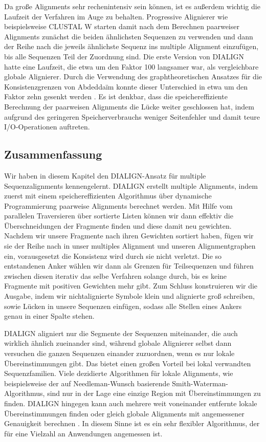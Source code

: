 Da große Alignments sehr rechenintensiv sein können, ist es außerdem wichtig die Laufzeit der Verfahren im Auge zu behalten. Progressive Alignierer wie beispielsweise CLUSTAL W starten damit nach dem Berechnen paarweiser Alignments zunächst die beiden ähnlichsten Sequenzen zu verwenden und dann der Reihe nach die jeweils ähnlichste Sequenz ins multiple Alignment einzufügen, bis alle Sequenzen Teil der Zuordnung sind.  Die erste Version von DIALIGN hatte eine Laufzeit, die etwa um den Faktor 100 langsamer war, als vergleichbare globale Alignierer. Durch die Verwendung des graphtheoretischen Ansatzes für die Konsistenzgrenzen von Abdedda\"im konnte dieser Unterschied in etwa um den Faktor zehn gesenkt werden \cite{am00}. Es ist denkbar, dass die speichereffiziente Berechnung der paarweisen Alignments die Lücke weiter geschlossen hat, indem aufgrund des geringeren Speicherverbrauchs weniger Seitenfehler und damit teure I/O-Operationen auftreten.


\subsection{Zusammenfassung}

Wir haben in diesem Kapitel den DIALIGN-Ansatz für multiple Sequenzalignments kennengelernt. DIALIGN erstellt multiple Alignments, indem zuerst mit einem speichereffizienten Algorithmus über dynamische Programmierung paarweise Alignments berechnet werden. Mit Hilfe vom parallelen Traversieren über sortierte Listen können wir dann effektiv die Überschneidungen der Fragmente finden und diese damit neu gewichten. Nachdem wir unsere Fragmente nach ihren Gewichten sortiert haben, fügen wir sie der Reihe nach in unser multiples Alignment und unseren Alignmentgraphen ein, vorausgesetzt die Konsistenz wird durch sie nicht verletzt. Die so entstandenen Anker wählen wir dann als Grenzen für Teilsequenzen und führen zwischen diesen iterativ das selbe Verfahren solange durch, bis es keine Fragmente mit positiven Gewichten mehr gibt. Zum Schluss konstruieren wir die Ausgabe, indem wir nichtalignierte Symbole klein und alignierte groß schreiben, sowie Lücken in unsere Sequenzen einfügen, sodass alle Stellen eines Ankers genau in einer Spalte stehen. 

DIALIGN aligniert nur die Segmente der Sequenzen miteinander, die auch wirklich ähnlich zueinander sind, während globale Alignierer selbst dann versuchen die ganzen Sequenzen einander zuzuordnen, wenn es nur lokale Übereinstimmungen gibt. Das bietet einen großen Vorteil bei lokal verwandten Sequenzfamilien. Viele dezidierte Algorithmen für lokale Alignments, wie beispielsweise der auf Needleman-Wunsch basierende Smith-Waterman-Algorithmus, sind nur in der Lage eine einzige Region mit Übereinstimmungen zu finden. DIALIGN hingegen kann auch mehrere weit voneinander entfernte lokale Übereinstimmungen finden oder gleich globale Alignments mit angemessener Genauigkeit berechnen \cite{mdw96}. In diesem Sinne ist es ein sehr flexibler Algorithmus, der für eine Vielzahl an Anwendungen angemessen ist. 

